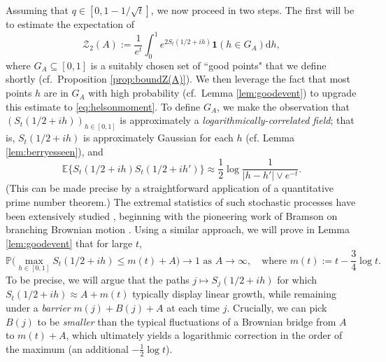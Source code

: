 \documentclass{amsart}
\theoremstyle{definition}
\theoremstyle{remark}
\numberwithin{equation}{section}
\begin{document}
Assuming that $q\in [0,1-1/\sqrt{t}]$, we now proceed in two steps. The first will be to estimate the expectation of
\[
     \mathcal{Z}_2(A):=\frac{1}{e^t}\int_0^1e^{2 S_{t}(1/2+ih)}\mathbf{1}(h\in G_A)\mathrm{d}h,
\]
where $G_A\subseteq [0,1]$ is a suitably chosen set of ``good points" that we define shortly (cf.\ Proposition \ref{prop:boundZ(A)}). We then leverage the fact that most points $h$ are in $G_A$ with high probability (cf.\ Lemma \ref{lem:goodevent}) to upgrade this estimate to \eqref{eq:helsonmoment}. To define $G_A$, we make the observation that $(S_t(1/2+ih))_{h\in [0,1]}$ is approximately a \textit{logarithmically-correlated field}; that is, $S_t(1/2+ih)$ is approximately Gaussian for each $h$ (cf. Lemma \ref{lem:berryesseen}), and 
 \[
     \mathbb{E}\big\{S_t(1/2+ih)S_t(1/2+ih')\big\}\approx\frac{1}{2}\log\frac{1}{|h-h'|\lor e^{-t}}.
 \]
  (This can be made precise by a straightforward application of a quantitative prime number theorem.) The extremal statistics of such stochastic processes have been extensively studied \cite{ArguinSurvey}, beginning with the pioneering work of Bramson on branching Brownian motion \cite{Bramson}. Using a similar approach, we will prove in Lemma \ref{lem:goodevent} that for large $t$,
  \begin{equation}\label{eq:}
     \mathbb{P}\Big(\max_{h\in [0,1]} S_t(1/2+ih) \leq m(t)+A\Big)\to 1 \text{ as $A\to\infty$},\quad \text{where } m(t):=t-\frac{3}{4}\log t.
  \end{equation}
  To be precise, we will argue that the paths $j\mapsto S_j(1/2+ih)$ for which $S_t(1/2+ih)\approx A+m(t)$ typically display linear growth, while remaining under a \textit{barrier} $m(j)+B(j)+A$ at each time $j$. Crucially, we can pick $B(j)$ to be \textit{smaller} than the typical fluctuations of a Brownian bridge from $A$ to $m(t)+A$, which ultimately yields a logarithmic correction in the order of the maximum (an additional $-\tfrac{1}{2}\log t$).
 
\end{document}
